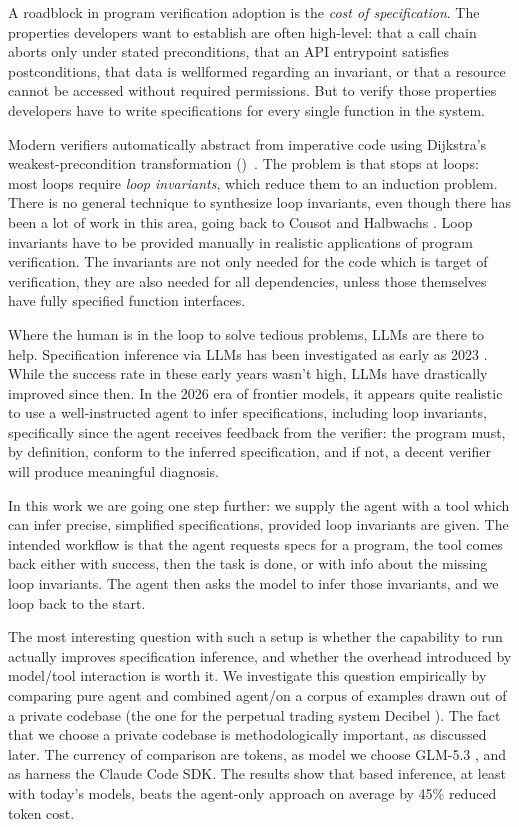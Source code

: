 \label{sec:intro}

A roadblock in program verification adoption is the \emph{cost of specification}.
The properties developers want to establish are often high-level: that a call chain aborts only under stated preconditions, that an API entrypoint satisfies postconditions, that data is wellformed regarding an invariant, or that a resource cannot be accessed without required permissions.
But to verify those properties developers have to write specifications for every single function in the system.

Modern verifiers automatically abstract from imperative code using Dijkstra's weakest-precondition transformation (\WP)~\cite{dijkstra1975wp}.
The problem is that \WP stops at loops:
most loops require \emph{loop invariants}, which reduce them to an induction problem.  There is no general technique to synthesize loop invariants, even though there has been a lot of work in this area, going back to Cousot and Halbwachs \cite{CousotHalbwachs78}.
Loop invariants have to be provided manually in realistic applications of program verification. The invariants are not only needed for the code which is target of verification, they are also needed for all dependencies, unless those themselves have fully specified function interfaces.

Where the human is in the loop to solve tedious problems, LLMs are there to help. Specification inference via LLMs has been investigated as early as 2023
\cite{PeiEtAl23, KamathEtAl23}. While the success rate in these early years wasn't high, LLMs have drastically improved since then. In the 2026 era of frontier models, it appears quite realistic to use a well-instructed agent to infer specifications, including loop invariants, specifically since the agent receives feedback from the verifier: the program must, by definition, conform to the inferred specification, and if not, a decent verifier will produce meaningful diagnosis.

In this work we are going one step further: we supply the agent with a \WP tool which can infer precise, simplified specifications, provided loop invariants are given.
The intended workflow is that the agent requests specs for a program, the tool comes back either with success, then the task is done, or with info about the missing loop invariants. The agent then asks the model to infer those invariants, and we loop back to the start.

The most interesting question with such a setup is whether the capability to run \WP actually improves specification inference, and whether the overhead introduced by model/tool interaction is worth it.
We investigate this question empirically by comparing pure agent and combined agent/\WP on a corpus of examples drawn out of a private codebase (the one for the perpetual trading system Decibel \cite{Decibel}).
The fact that we choose a private codebase is methodologically important, as discussed later. The currency of comparison are tokens, as model we choose GLM-5.3 \cite{GLM53}, and as harness the Claude Code SDK.
The results show that \WP based inference, at least with today's models, beats the agent-only approach on average by 45\% reduced token cost.

